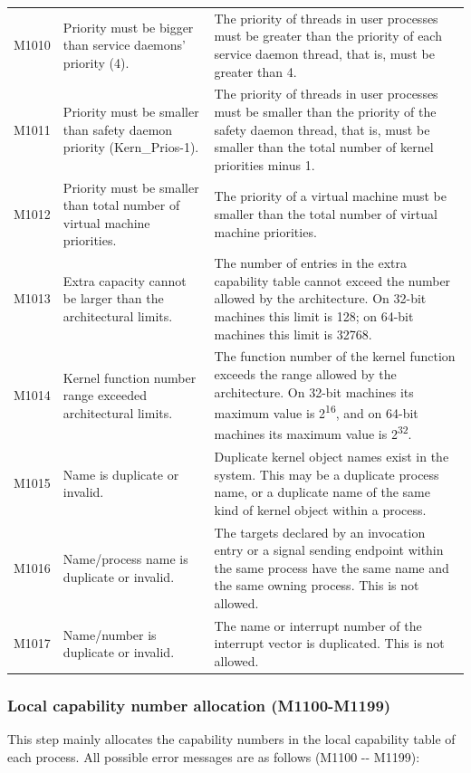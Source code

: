\begin{xltabular}{\textwidth}{@{}>{\hsize\raggedright\arraybackslash}X>{\hsize\raggedright\arraybackslash}X>{\hsize\raggedright\arraybackslash}X@{}}
M1010 & Priority must be bigger than service daemons' priority (4). &
The priority of threads in user processes must be greater than the priority of each service daemon thread, that is, must be greater than 4.\tabularnewline
M1011 & Priority must be smaller than safety daemon priority
(Kern\_\allowbreak{}Prios-1). &
The priority of threads in user processes must be smaller than the priority of the safety daemon thread, that is, must be smaller than the total number of kernel priorities minus 1.\tabularnewline
M1012 & Priority must be smaller than total number of virtual machine
priorities. & The priority of a virtual machine must be smaller than the total number of virtual machine priorities.\tabularnewline
M1013 & Extra capacity cannot be larger than the architectural limits. &
The number of entries in the extra capability table cannot exceed the number allowed by the architecture. On 32-bit machines this limit is 128; on 64-bit machines this limit is 32768.\tabularnewline
M1014 & Kernel function number range exceeded architectural limits. &
The function number of the kernel function exceeds the range allowed by the architecture. On 32-bit machines its maximum value is 2\textsuperscript{16}, and on 64-bit machines its maximum value is 2\textsuperscript{32}.\tabularnewline
M1015 & Name is duplicate or invalid. &
Duplicate kernel object names exist in the system. This may be a duplicate process name, or a duplicate name of the same kind of kernel object within a process.\tabularnewline
M1016 & Name/process name is duplicate or invalid. &
The targets declared by an invocation entry or a signal sending endpoint within the same process have the same name and the same owning process. This is not allowed.\tabularnewline
M1017 & Name/number is duplicate or invalid. &
The name or interrupt number of the interrupt vector is duplicated. This is not allowed.\tabularnewline
\end{xltabular}

\subsubsection{Local capability number allocation (M1100-M1199)}\label{subsubsec:5-6-5-2}

This step mainly allocates the capability numbers in the local capability table of each process. All possible error messages are as follows (M1100
-\/- M1199):

